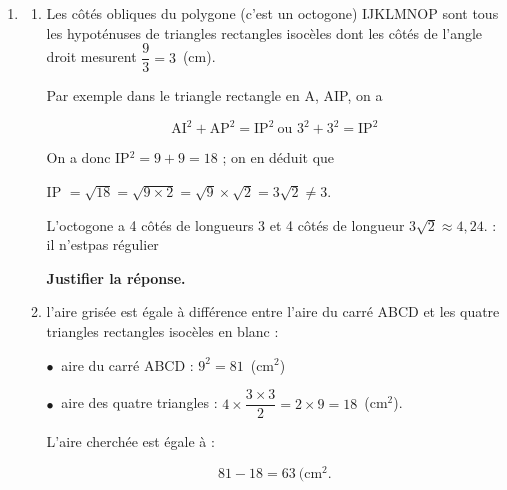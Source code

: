 \medskip

%

\begin{enumerate}
\item 
	\begin{enumerate}
		\item %
Les côtés obliques du polygone (c'est un octogone) IJKLMNOP sont tous les hypoténuses de triangles rectangles isocèles dont les côtés de l'angle droit mesurent $\dfrac93 = 3$~(cm).

Par exemple dans le triangle rectangle en A, AIP, on a 

\[\text{AI}^2 + \text{AP}^2 = \text{IP}^2\:\text{ou } 3^2 + 3^2 = \text{IP}^2\]

On a donc IP$^2 = 9 + 9 = 18$ ; on en déduit que 

IP $ = \sqrt{18} = \sqrt{9 \times 2} = \sqrt{9} \times \sqrt 2 = 3\sqrt 2\ne 3$.

L'octogone a 4 côtés de longueurs 3 et 4 côtés de longueur $3\sqrt{2} \approx 4,24$. : il n'estpas régulier

\textbf{Justifier la réponse.}
		\item %
l'aire grisée est égale à différence entre l'aire du carré ABCD et les quatre triangles rectangles isocèles en blanc :

$\bullet~$ aire du carré ABCD : $9^2 = 81$~(cm$^2$)

$\bullet~$ aire des quatre triangles : $4 \times \dfrac{3 \times 3}{2} = 2 \times 9 = 18$~(cm$^2$).

L'aire cherchée est égale à :

\[81 - 18 = 63~(\text{cm}^2.\]


\end{enumerate}
\end{enumerate}
